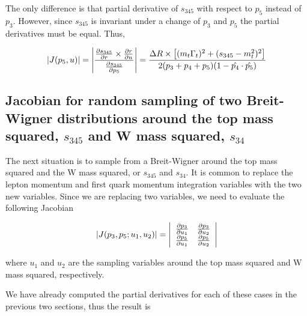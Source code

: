 The only difference is that partial derivative of $s_{345}$ with respect to
$p_{5}$ instead of $p_{3}$. However, since $s_{345}$ is invariant under a change
of $p_{3}$ and $p_{5}$ the partial derivatives must be equal. Thus, 

\begin{equation}
\label{jacobian_4}
|J(p_{5}, u)| = \left | \frac{\frac{\partial s_{345}}{\partial r} \times
\frac{\partial r}{\partial u}}{\frac{\partial s_{345}}{\partial p_{5}}} \right | = \frac{\Delta R \times \left[
(m_{t}\Gamma_{t})^{2} + (s_{345} - m_{t}^{2})^{2} \right]}{2(p_{3} + p_{4} + p_{5})(1 - \hat{p_{4}} \cdot \hat{p_{5}})}
\end{equation}





%
%


\subsection{Jacobian for random sampling of two Breit-Wigner distributions around
the top mass squared, $s_{345}$ and W mass squared, $s_{34}$}


The next situation is to sample from a Breit-Wigner around the
top mass squared and the W mass squared, or $s_{345}$ and $s_{34}$. It is common
to replace the lepton momentum and first quark momentum integration variables
with the two new variables. Since we are
replacing two variables, we need to evaluate the following Jacobian

\begin{equation}
|J(p_{3}, p_{5} ; u_{1}, u_{2})| = \left| \begin{array}{cc}
\frac{\partial p_{3}}{\partial u_{1}}	& \frac{\partial p_{3}}{\partial u_{2}} \\
\frac{\partial p_{5}}{\partial u_{1}}	& \frac{\partial p_{5}}{\partial u_{2}} \\
\end{array} \right|
\end{equation}

where $u_{1}$ and $u_{2}$ are the sampling variables around the top mass squared
and W mass squared, respectively.

We have already computed the partial derivatives for each of these cases
in the previous two sections, thus the result is

